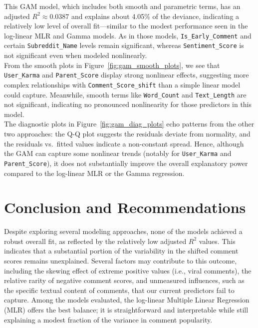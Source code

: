 \documentclass[10pt]{article}
\begin{document}
\noindent This GAM model, which includes both smooth and parametric terms, has an adjusted \(R^2 \approx 0.0387\) and explains about 4.05\% of the deviance, indicating a relatively low level of overall fit—similar to the modest performance seen in the log-linear MLR and Gamma models. As in those models, \texttt{Is\_Early\_Comment} and certain \texttt{Subreddit\_Name} levels remain significant, whereas \texttt{Sentiment\_Score} is not significant even when modeled nonlinearly. \\

\noindent From the smooth plots in Figure~\ref{fig:gam_smooth_plots}, we see that \texttt{User\_Karma} and \texttt{Parent\_Score} display strong nonlinear effects, suggesting more complex relationships with \texttt{Comment\_Score\_shift} than a simple linear model could capture. Meanwhile, smooth terms like \texttt{Word\_Count} and \texttt{Text\_Length} are not significant, indicating no pronounced nonlinearity for those predictors in this model.\\

\noindent The diagnostic plots in Figure~\ref{fig:gam_diag_plots} echo patterns from the other two approaches: the Q-Q plot suggests the residuals deviate from normality, and the residuals vs.\ fitted values indicate a non-constant spread. Hence, although the GAM can capture some nonlinear trends (notably for \texttt{User\_Karma} and \texttt{Parent\_Score}), it does not substantially improve the overall explanatory power compared to the log-linear MLR or the Gamma regression. 


\section{Conclusion and Recommendations}

Despite exploring several modeling approaches, none of the models achieved a robust overall fit, as reflected by the relatively low adjusted \(R^2\) values. This indicates that a substantial portion of the variability in the shifted comment scores remains unexplained. Several factors may contribute to this outcome, including the skewing effect of extreme positive values (i.e., viral comments), the relative rarity of negative comment scores, and unmeasured influences, such as the specific textual content of comments, that our current predictors fail to capture. Among the models evaluated, the log-linear Multiple Linear Regression (MLR) offers the best balance; it is straightforward and interpretable while still explaining a modest fraction of the variance in comment popularity. \\
\end{document}
